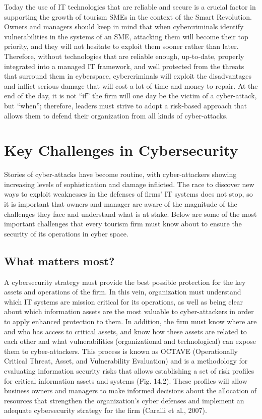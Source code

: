 \documentclass[
  letterpaper,
  DIV=11,
  numbers=noendperiod]{scrreprt}
\begin{document}
Today the use of IT technologies that are reliable and secure is a
crucial factor in supporting the growth of tourism SMEs in the context
of the Smart Revolution. Owners and managers should keep in mind that
when cybercriminals identify vulnerabilities in the systems of an SME,
attacking them will become their top priority, and they will not
hesitate to exploit them sooner rather than later. Therefore, without
technologies that are reliable enough, up-to-date, properly integrated
into a managed IT framework, and well protected from the threats that
surround them in cyberspace, cybercriminals will exploit the
disadvantages and inflict serious damage that will cost a lot of time
and money to repair. At the end of the day, it is not ``if'' the firm
will one day be the victim of a cyber-attack, but ``when''; therefore,
leaders must strive to adopt a risk-based approach that allows them to
defend their organization from all kinds of cyber-attacks.

\hypertarget{key-challenges-in-cybersecurity}{%
\section{Key Challenges in
Cybersecurity}\label{key-challenges-in-cybersecurity}}

Stories of cyber-attacks have become routine, with cyber-attackers
showing increasing levels of sophistication and damage inflicted. The
race to discover new ways to exploit weaknesses in the defenses of
firms' IT systems does not stop, so it is important that owners and
manager are aware of the magnitude of the challenges they face and
understand what is at stake. Below are some of the most important
challenges that every tourism firm must know about to ensure the
security of its operations in cyber space.

\hypertarget{what-matters-most}{%
\subsection{What matters most?}\label{what-matters-most}}

A cybersecurity strategy must provide the best possible protection for
the key assets and operations of the firm. In this vein, organization
must understand which IT systems are mission critical for its
operations, as well as being clear about which information assets are
the most valuable to cyber-attackers in order to apply enhanced
protection to them. In addition, the firm must know where are and who
has access to critical assets, and know how these assets are related to
each other and what vulnerabilities (organizational and technological)
can expose them to cyber-attackers. This process is known as OCTAVE
(Operationally Critical Threat, Asset, and Vulnerability Evaluation) and
is a methodology for evaluating information security risks that allows
establishing a set of risk profiles for critical information assets and
systems (Fig. 14.2). These profiles will allow business owners and
managers to make informed decisions about the allocation of resources
that strengthen the organization's cyber defenses and implement an
adequate cybersecurity strategy for the firm (Caralli et al., 2007).
\end{document}
